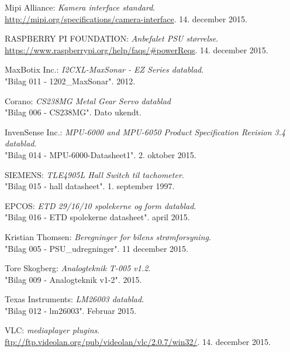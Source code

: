 \renewcommand{\bibname}{Litteraturliste}
\fancyhead[CE,CO]{}
\fancyfoot[CE,CO]{}
\begin{thebibliography}{2}

 Mipi Alliance: \textit{Kamera interface standard}. \\ 
\url{http://mipi.org/specifications/camera-interface}. 14. december 2015.

 RASPBERRY PI FOUNDATION: \textit{Anbefalet PSU størrelse}. \\
\url{https://www.raspberrypi.org/help/faqs/#powerReqs}. 14. december 2015.

 MaxBotix Inc.: \textit{I2CXL-MaxSonar - EZ Series datablad}. \\
"Bilag 011 - 1202\_MaxSonar". 2012.

 Corano: \textit{CS238MG Metal Gear Servo datablad}\\
"Bilag 006 - CS238MG". Dato ukendt.

 InvenSense Inc.: \textit{MPU-6000 and MPU-6050 Product Specification Revision 3.4 datablad}. \\
"Bilag 014 - MPU-6000-Datasheet1". 2. oktober 2015.

 SIEMENS: \textit{TLE4905L Hall Switch til tachometer}. \\
"Bilag 015 - hall datasheet". 1. september 1997.

 EPCOS: \textit{ETD 29/16/10 spolekerne og form datablad}. \\
"Bilag 016 - ETD spolekerne datasheet". april 2015.

 Kristian Thomsen: \textit{Beregninger for bilens strømforsyning}. \\
"Bilag 005 - PSU_udregninger". 11 december 2015.

 Tore Skogberg: \textit{Analogteknik T-005 v1.2}.\\
"Bilag 009 - Analogteknik v1-2". 2015.

 Texas Instruments: \textit{LM26003 datablad}. \\
"Bilag 012 - lm26003". Februar 2015.

 VLC: \textit{mediaplayer plugins}. \\
\url{ftp://ftp.videolan.org/pub/videolan/vlc/2.0.7/win32/}. 14. december 2015.


\end{thebibliography}
